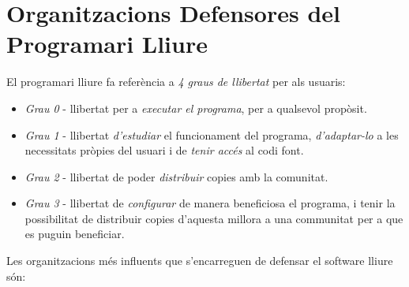 \section{Organitzacions Defensores del Programari Lliure}

El programari lliure fa referència a \emph{4 graus de llibertat} per als usuaris:

	\begin{itemize}
		\item \emph{Grau 0} - llibertat per a \emph{executar el programa}, per a qualsevol propòsit.
		\item \emph{Grau 1} - llibertat \emph{d'estudiar} el funcionament del programa, \emph{d'adaptar-lo} a les necessitats pròpies del usuari i de \emph{tenir accés} al codi font.
		\item \emph{Grau 2} - llibertat de poder \emph{distribuir} copies amb la comunitat.
		\item \emph{Grau 3} - llibertat de \emph{configurar} de manera beneficiosa el programa, i tenir la 		possibilitat de	distribuir copies d'aquesta millora a una communitat per a que es puguin 			beneficiar.
	\end{itemize}

Les organitzacions més influents que s'encarreguen de defensar el software lliure són:
 

